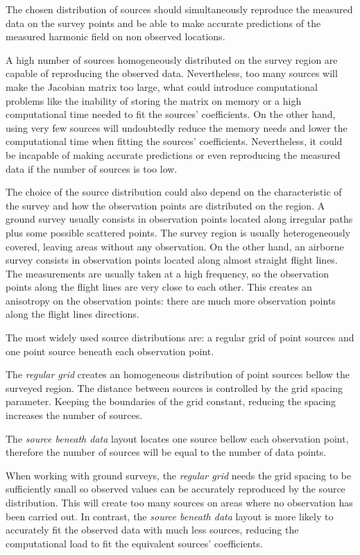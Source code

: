 \documentclass[twocolumn]{article}
\begin{document}
The chosen distribution of sources should simultaneously reproduce the measured
data on the survey points and be able to make accurate predictions of the
measured harmonic field on non observed locations.

A high number of sources homogeneously distributed on the survey region are
capable of reproducing the observed data. Nevertheless, too many sources will
make the Jacobian matrix too large, what could introduce computational problems
like the inability of storing the matrix on memory or a high computational time
needed to fit the sources' coefficients.
On the other hand, using very few sources will undoubtedly reduce the memory
needs and lower the computational time when fitting the sources' coefficients.
Nevertheless, it could be incapable of making accurate predictions or even
reproducing the measured data if the number of sources is too low.

The choice of the source distribution could also depend on the characteristic
of the survey and how the observation points are distributed on the region.
A ground survey usually consists in observation points located along irregular
paths plus some possible scattered points.
The survey region is usually heterogeneously covered, leaving areas without any
observation.
On the other hand, an airborne survey consists in observation points located
along almost straight flight lines. The measurements are usually taken at
a high frequency, so the observation points along the flight lines are very
close to each other.
This creates an anisotropy on the observation points: there are much more
observation points along the flight lines directions.

The most widely used source distributions are: a regular grid of point sources
and one point source beneath each observation point.

The \emph{regular grid} creates an homogeneous distribution of point sources
bellow the surveyed region.
The distance between sources is controlled by the grid spacing parameter.
Keeping the boundaries of the grid constant, reducing the spacing increases the
number of sources.

The \emph{source beneath data} layout locates one source bellow each
observation point, therefore the number of sources will be equal to the number
of data points.

When working with ground surveys, the \emph{regular grid} needs the grid
spacing to be sufficiently small so observed values can be accurately
reproduced by the source distribution.
This will create too many sources on areas where no observation has been
carried out.
In contrast, the \emph{source beneath data} layout is more likely to accurately
fit the observed data with much less sources, reducing the computational load
to fit the equivalent sources' coefficients.
\end{document}
